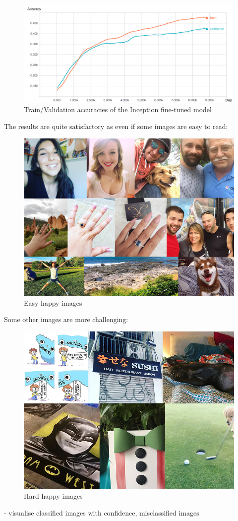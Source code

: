 \begin{figure}[H]
    \centering
    \includegraphics[width=\textwidth]{Images/image_model_accuracies_cleaned.jpg}
    \caption{Train/Validation accuracies of the Inception fine-tuned model}
\end{figure}

The results are quite satisfactory as even if some images are easy to read:

\begin{figure}[H]
    \centering
    \includegraphics[width=\textwidth]{Images/happy_easy.jpg}
    \caption{Easy happy images}
\end{figure}

Some other images are more challenging:

\begin{figure}[H]
    \centering
    \includegraphics[width=\textwidth]{Images/happy_hard.jpg}
    \caption{Hard happy images}
\end{figure}

- visualise classified images with confidence, misclassified images




